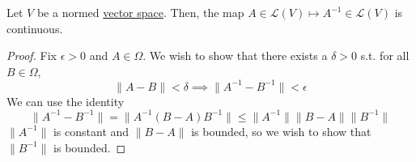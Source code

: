 	\begin{theorem}
		\label{thm:inversion_continuous}
		Let $V$ be a normed \hyperref[def:vector-space]{vector space}. Then, the map $A \in \mathcal{L}(V) \mapsto A^{-1} \in \mathcal{L}(V)$ is continuous. 
	\end{theorem}
	\begin{proof}
	  Fix $\epsilon > 0$ and $A \in \Omega$. We wish to show that there exists a $\delta > 0$ s.t. for all $B \in \Omega$, 
		\begin{equation}
			\|A - B\| < \delta \implies \|A^{-1} - B^{-1}\| < \epsilon
		\end{equation}
		We can use the identity 
		\begin{equation}
			\| A^{-1} - B^{-1} \| = \|A^{-1} (B - A) B^{-1} \| \leq \|A^{-1}\| \|B - A\| \|B^{-1}\|
		\end{equation}
		$\|A^{-1}\|$ is constant and $\|B - A\|$ is bounded, so we wish to show that $\|B^{-1}\|$ is bounded. 


\end{proof}

